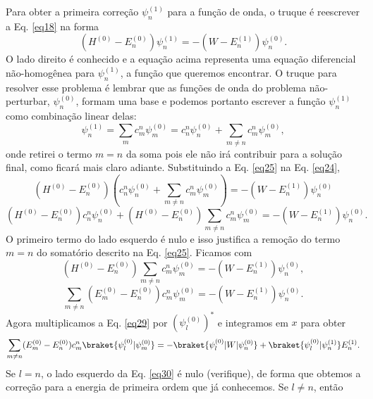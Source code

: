 \documentclass{article}
\begin{document}
Para obter a primeira correção $\psi_n^{(1)}$ para a função de onda, o truque é reescrever a Eq. \eqref{eq18} na forma
\begin{equation}
    (H^{(0)} - E_n^{(0)})\psi_n^{(1)} =- (W - E_n^{(1)}) \psi_n^{(0)}.
    \label{eq24}
\end{equation}
O lado direito é conhecido e a equação acima representa uma equação diferencial não-homogênea para $\psi_n^{(1)}$, a função que queremos encontrar. O truque para resolver esse problema é lembrar que as funções de onda do problema não-perturbar, $\psi_n^{(0)}$, formam uma base e podemos portanto escrever a função $\psi_n^{(1)}$ como combinação linear delas:
\begin{equation}
    \psi_n^{(1)} = \sum_m c_m^n \psi_m^{(0)} = c_n^n \psi_n^{(0)} + \sum_{m\neq n} c_m^n \psi_m^{(0)},
    \label{eq25}
\end{equation}
onde retirei o termo $m = n$ da soma pois ele não irá contribuir para a solução final, como ficará mais claro adiante. Substituindo a Eq. \eqref{eq25} na Eq. \eqref{eq24},
\begin{equation}
    (H^{(0)} - E_n^{(0)})\left( c_n^n \psi_n^{(0)} + \sum_{m\neq n} c_m^n \psi_m^{(0)} \right) = - (W - E_n^{(1)}) \psi_n^{(0)}
\end{equation}
\begin{equation}
    (H^{(0)} - E_n^{(0)})c_n^n \psi_n^{(0)} + (H^{(0)} - E_n^{(0)})\sum_{m\neq n} c_m^n \psi_m^{(0)}  = - (W - E_n^{(1)}) \psi_n^{(0)}.
\end{equation}
O primeiro termo do lado esquerdo é nulo e isso justifica a remoção do termo $m=n$ do somatório descrito na Eq. \eqref{eq25}. Ficamos com
\begin{equation}
    (H^{(0)} - E_n^{(0)})\sum_{m\neq n} c_m^n \psi_m^{(0)}  = - (W - E_n^{(1)}) \psi_n^{(0)},
\end{equation}
\begin{equation}
    \sum_{m\neq n} (E_m^{(0)} - E_n^{(0)}) c_m^n \psi_m^{(0)}  = - (W - E_n^{(1)}) \psi_n^{(0)}.
    \label{eq29}
\end{equation}
Agora multiplicamos a Eq. \eqref{eq29} por $(\psi_l^{(0)})^{*}$ e integramos em $x$ para obter
\begin{equation}
    \sum_{m\neq n} (E_m^{(0)} - E_n^{(0)}) c_m^n \braket{\psi_l^{(0)}|\psi_m^{(0)}}  = -\braket{\psi_l^{(0)}|W|\psi_n^{(0)}} + \braket{\psi_l^{(0)}|\psi_n^{(1)}}E_n^{(1)}.
\label{eq30}
\end{equation}
Se $l = n$, o lado esquerdo da Eq. \eqref{eq30} é nulo (verifique), de forma que obtemos a correção para a energia de primeira ordem que já conhecemos. Se $l\neq n$, então
\end{document}
